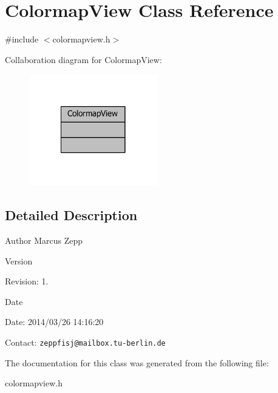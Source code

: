 \section{Colormap\-View Class Reference}
\label{classColormapView}


{\ttfamily \#include $<$colormapview.\-h$>$}



Collaboration diagram for Colormap\-View\-:
\nopagebreak
\begin{figure}[H]
\begin{center}
\leavevmode
\includegraphics[width=158pt]{d5/da7/classColormapView__coll__graph}
\end{center}
\end{figure}


\subsection{Detailed Description}
\begin{DoxyAuthor}{Author}
Marcus Zepp
\end{DoxyAuthor}
\begin{DoxyVersion}{Version}

\end{DoxyVersion}
\begin{DoxyParagraph}{Revision\-:}
1. 
\end{DoxyParagraph}


\begin{DoxyDate}{Date}

\end{DoxyDate}
\begin{DoxyParagraph}{Date\-:}
2014/03/26 14\-:16\-:20 
\end{DoxyParagraph}


Contact\-: {\tt zeppfisj@mailbox.\-tu-\/berlin.\-de} 

The documentation for this class was generated from the following file\-:\begin{DoxyCompactItemize}
\item 
colormapview.\-h\end{DoxyCompactItemize}
